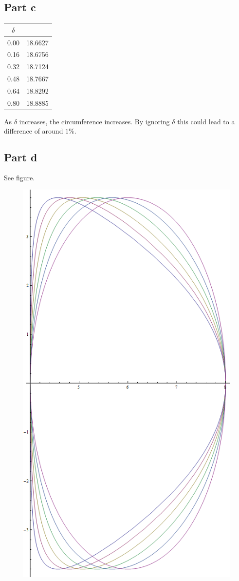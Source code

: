 \documentclass[12pt]{article}
\begin{document}
\subsection*{Part c}
\begin{tabular}{c | c}
$\delta$ & \\
\hline
0.00 & 18.6627 \\
0.16 & 18.6756 \\
0.32 & 18.7124 \\
0.48 & 18.7667 \\
0.64 & 18.8292 \\
0.80 & 18.8885
\end{tabular}

As $\delta$ increases, the circumference increases.
By ignoring $\delta$ this could lead to a difference of around $1\%$.

\subsection*{Part d}
See figure.
\begin{figure}
\includegraphics[width=4.5in]{ps8-q4.png}
\end{figure}
\end{document}
